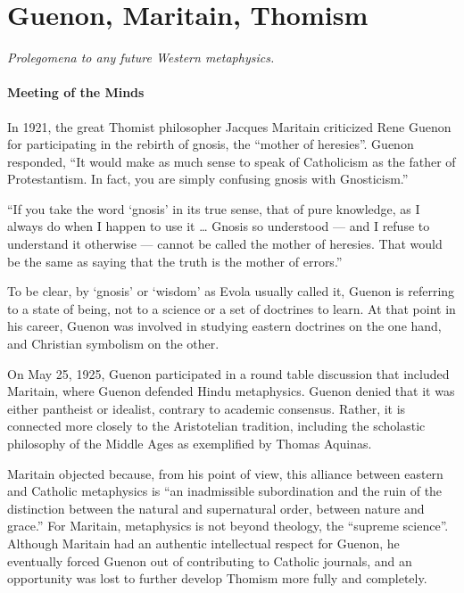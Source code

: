 \section{Guenon, Maritain, Thomism}

\emph{Prolegomena to any future Western metaphysics.}

\paragraph{Meeting of the Minds}
In 1921, the great Thomist philosopher Jacques Maritain criticized Rene Guenon for participating in the rebirth of gnosis, the “mother of heresies”. Guenon responded, “It would make as much sense to speak of Catholicism as the father of Protestantism. In fact, you are simply confusing gnosis with Gnosticism.”

“If you take the word `gnosis' in its true sense, that of pure knowledge, as I always do when I happen to use it … Gnosis so understood — and I refuse to understand it otherwise — cannot be called the mother of heresies. That would be the same as saying that the truth is the mother of errors.”

To be clear, by `gnosis' or `wisdom' as Evola usually called it, Guenon is referring to a state of being, not to a science or a set of doctrines to learn. At that point in his career, Guenon was involved in studying eastern doctrines on the one hand, and Christian symbolism on the other.

On May 25, 1925, Guenon participated in a round table discussion that included Maritain, where Guenon defended Hindu metaphysics. Guenon denied that it was either pantheist or idealist, contrary to academic consensus. Rather, it is connected more closely to the Aristotelian tradition, including the scholastic philosophy of the Middle Ages as exemplified by Thomas Aquinas.

Maritain objected because, from his point of view, this alliance between eastern and Catholic metaphysics is “an inadmissible subordination and the ruin of the distinction between the natural and supernatural order, between nature and grace.” For Maritain, metaphysics is not beyond theology, the “supreme science”. Although Maritain had an authentic intellectual respect for Guenon, he eventually forced Guenon out of contributing to Catholic journals, and an opportunity was lost to further develop Thomism more fully and completely.


